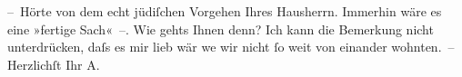 \begin{ledgroupsized}[t]{13cm}
           \pstart
           – Hörte von dem echt jüdiſchen Vorgehen Ihres Hausherrn. Immerhin wäre es eine »fertige Sach« –.\pend
           \pstart
           Wie gehts Ihnen denn? Ich kann die Bemerkung nicht unterdrücken, daſs es mir lieb wär
                  we{\geminationn} wir nicht ſo weit von einander wohnten. –
               Herzlichſt Ihr \spacefill\mbox{A.}\pend
           \endnumbering{}\end{ledgroupsized}  \newcommand{\dateiname}{L01467}\newcommand{\titel}{Arthur Schnitzler an Richard Beer-Hofmann, 8. 11. 1904}\newcommand{\editorInnen}{Martin Anton Müller und Gerd-Hermann Susen}
      